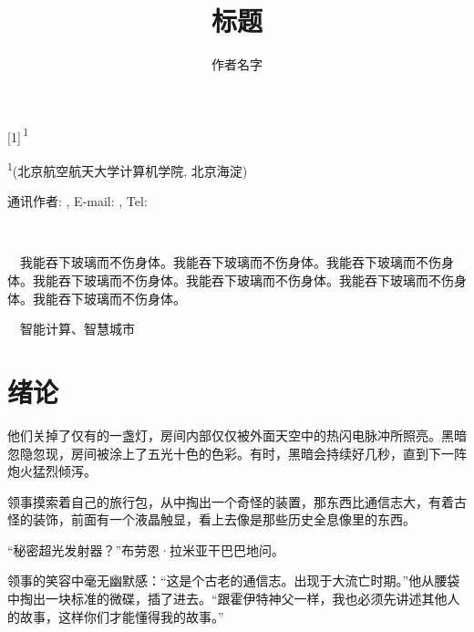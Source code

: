 \documentclass[
  b5paper, 
  10pt, 
  AutoFakeBold, 
  AutoFakeSlant
]{article}
\author{作者名字}
\title{标题}
\makeatletter
\newcommand{\theauthor}[0]{\@author}
\newcommand{\theattitle}[0]{\@title}
\newcommand{\theemail}[0]{\relax}
\newcommand{\thetelephone}[0]{\relax}
\newcommand{\emailcolor}[1]{\textcolor{emailcolor}{#1}}
\makeatother
\begin{document}
\afterpage{\aftergroup\restoregeometry}

\thispagestyle{empty}

\setlength{\parskip}{0cm}
{%
\heiti%
%
\centerline{\theattitle}%
\addcontentsline{toc}{section}{\theattitle}%
}%
%
{%
%
\setmainfont{FangSong}%
\vspace*{8pt}%
\fangsong%
\centerline{\scalebox{0.667}[1]{\theauthor\,\textsuperscript{1}}}%
\vspace*{12pt}%
}%
%
{%
\noindent%
%
\fontsize{8pt}{9.6pt}\selectfont%
\setlength{\hangindent}{0.7em}%
\centerline{\textsuperscript{1}(北京航空航天大学\enspace{}计算机学院, 北京\enspace{}海淀)}

\centerline{通讯作者: \theauthor, E-mail: \href{mailto:\theemail}{\emailcolor{\underline{\smash{\theemail}}}}, Tel: \thetelephone}%

~

}%

　{\kaiti{}我能吞下玻璃而不伤身体。我能吞下玻璃而不伤身体。我能吞下玻璃而不伤身体。我能吞下玻璃而不伤身体。我能吞下玻璃而不伤身体。我能吞下玻璃而不伤身体。我能吞下玻璃而不伤身体。}

　{\kaiti{}智能计算、智慧城市}

\setlength{\rightskip}{0.35pt}
\setlength{\parskip}{0.1pt}

\section{绪论}

他们关掉了仅有的一盏灯，房间内部仅仅被外面天空中的热闪电脉冲所照亮。黑暗忽隐忽现，房间被涂上了五光十色的色彩。有时，黑暗会持续好几秒，直到下一阵炮火猛烈倾泻。

领事摸索着自己的旅行包，从中掏出一个奇怪的装置，那东西比通信志大，有着古怪的装饰，前面有一个液晶触显，看上去像是那些历史全息像里的东西。

“秘密超光发射器？”布劳恩·拉米亚干巴巴地问。

领事的笑容中毫无幽默感：“这是个古老的通信志。出现于大流亡时期。”他从腰袋中掏出一块标准的微碟，插了进去。“跟霍伊特神父一样，我也必须先讲述其他人的故事，这样你们才能懂得我的故事。”
\end{document}
